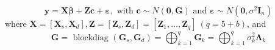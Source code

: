 \begin{equation}
    \boldsymbol{y}=\boldsymbol{X} \boldsymbol{\beta}+\boldsymbol{Z} \boldsymbol{c}+\boldsymbol{\varepsilon}, \text { with } \boldsymbol{c} \sim N(\mathbf{0}, \boldsymbol{G}) \text { and } \boldsymbol{\varepsilon} \sim N\left(\mathbf{0}, \sigma^{2} \boldsymbol{I}_{n}\right)
\end{equation}
where $\boldsymbol{X}=\left[\boldsymbol{X}_{s}, \boldsymbol{X}_{d}\right], \boldsymbol{Z}=\left[\boldsymbol{Z}_{s}, \boldsymbol{Z}_{d}\right]=\left[\boldsymbol{Z}_{1}, \ldots, \boldsymbol{Z}_{q}\right] \ (q=5+b)$, and 
\begin{equation}
    \boldsymbol{G}=\text { blockdiag }\left(\boldsymbol{G}_{s}, \boldsymbol{G}_{d}\right)=\bigoplus_{k=1}^{q} \boldsymbol{G}_{k}=\bigoplus_{k=1}^{q} \sigma_{k}^{2} \boldsymbol{\Lambda}_{k}
\end{equation}

